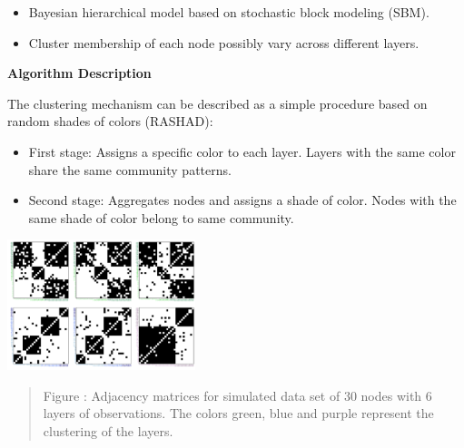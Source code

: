 \documentclass[a1,portrait,final]{a0poster}
\newenvironment{poster}{
  \begin{center}
  \begin{minipage}[c]{0.98\textwidth}
}{
  \end{minipage}
  \end{center}
}
\newcommand{\mycaption}[1]{
  \vspace{0.25cm}
  \begin{quote}
    {{\sc Figure} \arabic{figure}: #1}
  \end{quote}
  \vspace{0.25cm}
  \stepcounter{figure}
}
\begin{document}
\begin{poster}
\begin{multicols}{2}
\begin{itemize}
\item Bayesian hierarchical model based on stochastic block modeling (SBM).

\vspace{.2cm}

\item Cluster membership of each node possibly vary across different layers.
\end{itemize}

\vspace{0.5cm}

\begin{center}
\textbf{Algorithm Description}
\end{center}

\vspace{0.5cm}

The clustering mechanism can be described as a simple procedure based on random shades of colors (RASHAD):

\vspace{.2cm}

\begin{itemize}
\item First stage: Assigns a specific color to each layer. Layers with the same color share the same community patterns.

\vspace{.2cm}

\item Second stage: Aggregates nodes and assigns a shade of color. Nodes with the same shade of color belong to same community.
 \end{itemize}
 
 \vspace{0.2cm}

\begin{center}
\includegraphics[width=0.41\textwidth]{Y30simShade.pdf}
\vspace{-0.2cm}
\mycaption{Adjacency matrices for simulated data set of 30 nodes with 6 layers of observations. The colors green, blue and purple represent the clustering of the layers.}
\end{center}


\end{multicols}
\end{poster}
\end{document}
